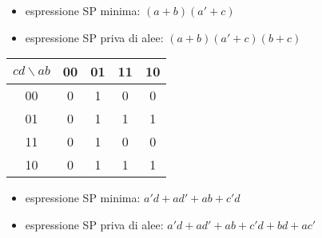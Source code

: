 \documentclass{article}
\begin{document}
\begin{itemize}
    \item espressione SP minima: $(a+b)(a'+c)$
    \item espressione SP priva di alee: $(a+b)(a'+c)(b+c)$
\end{itemize}

\begin{center}
\begin{tabular}{ |c|c|c|c|c| }
\hline
$cd \backslash ab$ & 00 & 01 & 11 & 10 \\
\hline
\hline
00 & 0 & 1 & 0 & 0 \\
01 & 0 & 1 & 1 & 1 \\
11 & 0 & 1 & 0 & 0 \\
10 & 0 & 1 & 1 & 1 \\
\hline
\end{tabular}
\end{center}

\begin{itemize}
    \item espressione SP minima: $a'd + ad' + ab + c'd$
    \item espressione SP priva di alee: $a'd + ad' + ab + c'd + bd + ac'$
\end{itemize}
\end{document}
